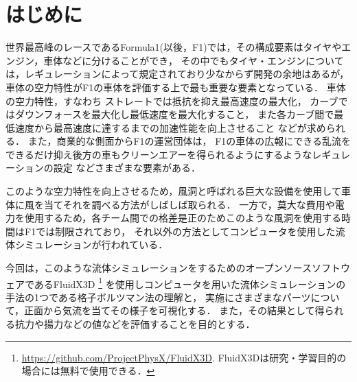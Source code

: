\documentclass[main]{subfiles}
\begin{document}
\chapter{はじめに}

世界最高峰のレースであるFormula1(以後，F1)では，その構成要素はタイヤやエンジン，車体などに分けることができ，
その中でもタイヤ・エンジンについては，レギュレーションによって規定されており少なからず開発の余地はあるが，車体の空力特性がF1の車体を評価する上で最も重要な要素となっている．\cite{ref:f1-wind-tunnel}
車体の空力特性，すなわち
ストレートでは抵抗を抑え最高速度の最大化，
カーブではダウンフォースを最大化し最低速度を最大化すること，
また各カーブ間で最低速度から最高速度に達するまでの加速性能を向上させること
などが求められる．
また，商業的な側面からF1の運営団体は，
F1の車体の広報にできる乱流をできるだけ抑え後方の車もクリーンエアーを得られるようにするようなレギュレーションの設定
などさまざまな要素がある．

このような空力特性を向上させるため，風洞と呼ばれる巨大な設備を使用して車体に風を当てそれを調べる方法がしばしば取られる．
一方で，莫大な費用や電力を使用するため，各チーム間での格差是正のためこのような風洞を使用する時間はF1では制限されており\cite{ref:f1-sporting-regulations}，
それ以外の方法としてコンピュータを使用した流体シミュレーションが行われている．

今回は，このような流体シミュレーションをするためのオープンソースソフトウェアであるFluidX3D
\footnote{
    \url{https://github.com/ProjectPhysX/FluidX3D}.
    FluidX3Dは研究・学習目的の場合には無料で使用できる．
}
を使用しコンピュータを用いた流体シミュレーションの手法の1つである格子ボルツマン法の理解と，
実施にさまざまなパーツについて，正面から気流を当てその様子を可視化する．
また，その結果として得られる抗力や揚力などの値などを評価することを目的とする．
\end{document}
